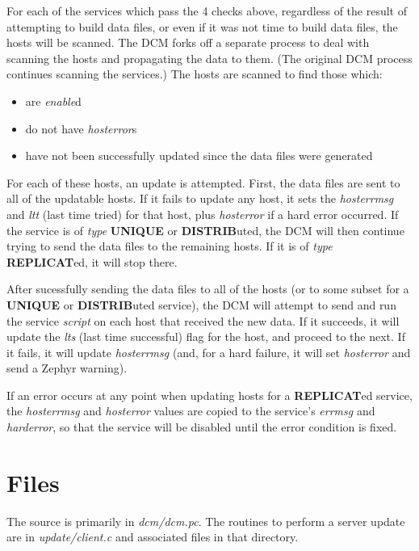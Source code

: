 For each of the services which pass the 4 checks above, regardless of
the result of attempting to build data files, or even if it was not
time to build data files, the hosts will be scanned. The DCM forks off
a separate process to deal with scanning the hosts and propagating the
data to them. (The original DCM process continues scanning the
services.) The hosts are scanned to find those which:

\begin{itemize}
\item are {\it enable\/}d

\item do not have {\it hosterror\/}s

\item have not been successfully updated since the data files were generated
\end{itemize}

For each of these hosts, an update is attempted. First, the data files
are sent to all of the updatable hosts. If it fails to update any
host, it sets the {\it hosterrmsg\/} and {\it ltt\/} (last time tried)
for that host, plus {\it hosterror\/} if a hard error occurred. If the
service is of {\it type\/} {\bf UNIQUE} or {\bf DISTRIB}uted, the DCM
will then continue trying to send the data files to the remaining
hosts. If it is of {\it type\/} {\bf REPLICAT}ed, it will stop there.

After sucessfully sending the data files to all of the hosts (or to
some subset for a {\bf UNIQUE} or {\bf DISTRIB}uted service), the DCM
will attempt to send and run the service {\it script\/} on each host
that received the new data. If it succeeds, it will update the {\it
lts\/} (last time successful) flag for the host, and proceed to the
next. If it fails, it will update {\it hosterrmsg\/} (and, for a hard
failure, it will set {\it hosterror\/} and send a Zephyr warning).

If an error occurs at any point when updating hosts for a {\bf
REPLICAT}ed service, the {\it hosterrmsg\/} and {\it hosterror\/}
values are copied to the service's {\it errmsg\/} and {\it
harderror}, so that the service will be disabled until the error
condition is fixed.


\section{Files}

The source is primarily in {\it dcm/dcm.pc}. The routines to perform a
server update are in {\it update/client.c} and associated files in
that directory.


